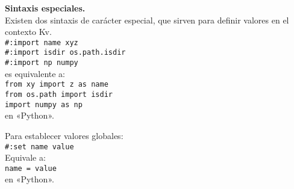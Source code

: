 \textbf{Sintaxis especiales.}\\
Existen dos sintaxis de carácter especial, que sirven para definir valores en el contexto Kv.\\
\texttt{\#:import name xyz\\
\#:import isdir os.path.isdir\\
\#:import np numpy}\\
es equivalente a:\\
\texttt{from xy import z as name\\
from os.path import isdir\\
import numpy as np}\\
en «Python».

Para establecer valores globales:\\
\texttt{\#:set name value}\\
Equivale a:\\
\texttt{name = value }\\
en «Python».\\
